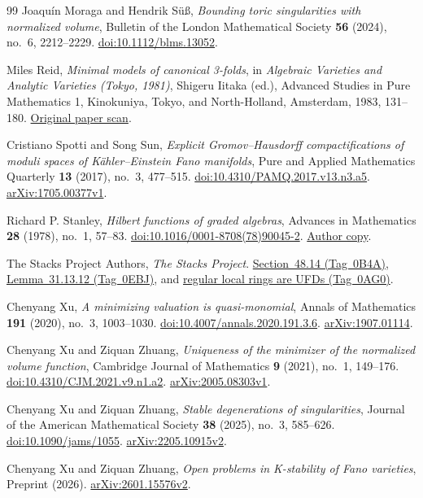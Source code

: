 \documentclass[11pt]{article}
\theoremstyle{definition}
\theoremstyle{remark}
\numberwithin{equation}{section}
\begin{document}
\begin{thebibliography}{99}
Joaqu\'in Moraga and Hendrik S\"u\ss{},
\emph{Bounding toric singularities with normalized volume},
Bulletin of the London Mathematical Society \textbf{56} (2024), no.~6, 2212--2229.
\href{https://doi.org/10.1112/blms.13052}{doi:10.1112/blms.13052}.

Miles Reid,
\emph{Minimal models of canonical 3-folds},
in \emph{Algebraic Varieties and Analytic Varieties (Tokyo, 1981)}, Shigeru Iitaka (ed.), Advanced Studies in Pure Mathematics 1, Kinokuniya, Tokyo, and North-Holland, Amsterdam, 1983, 131--180.
\href{https://webhomes.maths.ed.ac.uk/cheltsov/quotient/pdf/reid2.pdf}{Original paper scan}.


Cristiano Spotti and Song Sun,
\emph{Explicit Gromov--Hausdorff compactifications of moduli spaces of K\"ahler--Einstein Fano manifolds},
Pure and Applied Mathematics Quarterly \textbf{13} (2017), no.~3, 477--515.
\href{https://doi.org/10.4310/PAMQ.2017.v13.n3.a5}{doi:10.4310/PAMQ.2017.v13.n3.a5}.
\href{https://arxiv.org/abs/1705.00377v1}{arXiv:1705.00377v1}.

Richard P. Stanley,
\emph{Hilbert functions of graded algebras},
Advances in Mathematics \textbf{28} (1978), no.~1, 57--83.
\href{https://doi.org/10.1016/0001-8708(78)90045-2}{doi:10.1016/0001-8708(78)90045-2}.
\href{https://math.mit.edu/~rstan/pubs/pubfiles/30.pdf}{Author copy}.

The Stacks Project Authors,
\emph{The Stacks Project}.
\href{https://stacks.math.columbia.edu/tag/0B4A}{Section~48.14 (Tag~0B4A)},
\href{https://stacks.math.columbia.edu/tag/0EBJ}{Lemma~31.13.12 (Tag~0EBJ)}, and
\href{https://stacks.math.columbia.edu/tag/0AG0}{regular local rings are UFDs (Tag~0AG0)}.

Chenyang Xu,
\emph{A minimizing valuation is quasi-monomial},
Annals of Mathematics \textbf{191} (2020), no.~3, 1003--1030.
\href{https://doi.org/10.4007/annals.2020.191.3.6}{doi:10.4007/annals.2020.191.3.6}.
\href{https://arxiv.org/abs/1907.01114}{arXiv:1907.01114}.

Chenyang Xu and Ziquan Zhuang,
\emph{Uniqueness of the minimizer of the normalized volume function},
Cambridge Journal of Mathematics \textbf{9} (2021), no.~1, 149--176.
\href{https://doi.org/10.4310/CJM.2021.v9.n1.a2}{doi:10.4310/CJM.2021.v9.n1.a2}.
\href{https://arxiv.org/abs/2005.08303v1}{arXiv:2005.08303v1}.

Chenyang Xu and Ziquan Zhuang,
\emph{Stable degenerations of singularities},
Journal of the American Mathematical Society \textbf{38} (2025), no.~3, 585--626.
\href{https://doi.org/10.1090/jams/1055}{doi:10.1090/jams/1055}.
\href{https://arxiv.org/abs/2205.10915v2}{arXiv:2205.10915v2}.

Chenyang Xu and Ziquan Zhuang,
\emph{Open problems in K-stability of Fano varieties},
Preprint (2026).
\href{https://arxiv.org/abs/2601.15576v2}{arXiv:2601.15576v2}.

\end{thebibliography}
\end{document}
